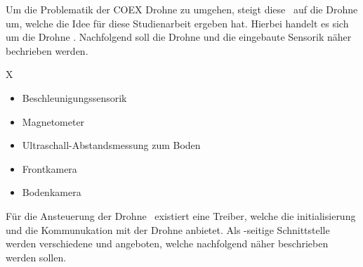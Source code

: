 
Um die Problematik der COEX Drohne zu umgehen, steigt diese \Arbeit\ auf die Drohne um, welche die Idee für diese Studienarbeit ergeben hat.
Hierbei handelt es sich um die Drohne \Ar. Nachfolgend soll die Drohne und die eingebaute Sensorik näher bechrieben werden.





\missing

X


\missing


















\begin{itemize}
\item Beschleunigungssensorik
\item Magnetometer
\item Ultraschall-Abstandsmessung zum Boden
\item Frontkamera
\item Bodenkamera
\end{itemize}










Für die Ansteuerung der Drohne \Ar\ existiert eine Treiber, welche die initialisierung und die Kommunukation mit der Drohne anbietet. Als \ROS-seitige Schnittstelle werden verschiedene \Topic[s] und \Service[s] angeboten, welche nachfolgend näher beschrieben werden sollen.










